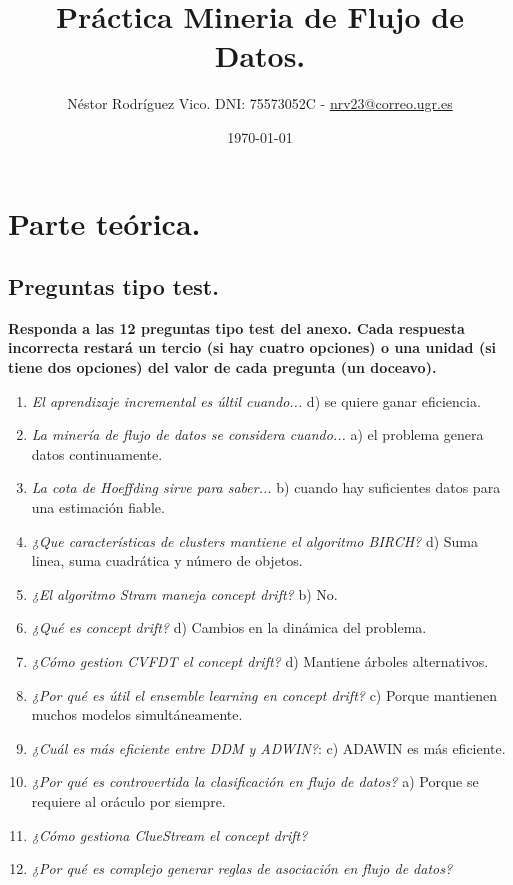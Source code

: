 \documentclass[11pt]{article}
\title{Práctica Mineria de Flujo de Datos.}
\author{Néstor Rodríguez Vico. DNI: 75573052C - \href{mailto:nrv23@correo.ugr.es}{nrv23@correo.ugr.es}}
\date{\today}
\begin{document}
\maketitle

\setlength{\belowdisplayskip}{5pt} 
\setlength{\belowdisplayshortskip}{5pt}
\setlength{\abovedisplayskip}{5pt} 
\setlength{\abovedisplayshortskip}{5pt}

\section{Parte teórica.}

\subsection{Preguntas tipo test.}

\textbf{Responda a las 12 preguntas tipo test del anexo. Cada respuesta incorrecta restará un tercio (si hay cuatro opciones) o una unidad (si tiene dos opciones) del valor de cada pregunta (un doceavo).}

\begin{enumerate}
	\item \textit{El aprendizaje incremental es últil cuando...} d) se quiere ganar eficiencia.
	\item \textit{La minería de flujo de datos se considera cuando...} a) el problema genera datos continuamente.
	\item \textit{La cota de Hoeffding sirve para saber...} b) cuando hay suficientes datos para una estimación fiable.
	\item \textit{¿Que características de clusters mantiene el algoritmo BIRCH?} d) Suma linea, suma cuadrática y número de objetos.
	\item \textit{¿El algoritmo Stram maneja concept drift?} b) No.
	\item \textit{¿Qué es concept drift?} d) Cambios en la dinámica del problema.
	\item \textit{¿Cómo gestion CVFDT el concept drift?} d) Mantiene árboles alternativos.
	\item \textit{¿Por qué es útil el ensemble learning en concept drift?} c) Porque mantienen muchos modelos simultáneamente.
	\item \textit{¿Cuál es más eficiente entre DDM y ADWIN?}: c) ADAWIN es más eficiente.
	\item \textit{¿Por qué es controvertida la clasificación en flujo de datos?} a) Porque se requiere al oráculo por siempre.
	\item \textit{¿Cómo gestiona ClueStream el concept drift?}
	\item \textit{¿Por qué es complejo generar reglas de asociación en flujo de datos?}
\end{enumerate}
\end{document}
